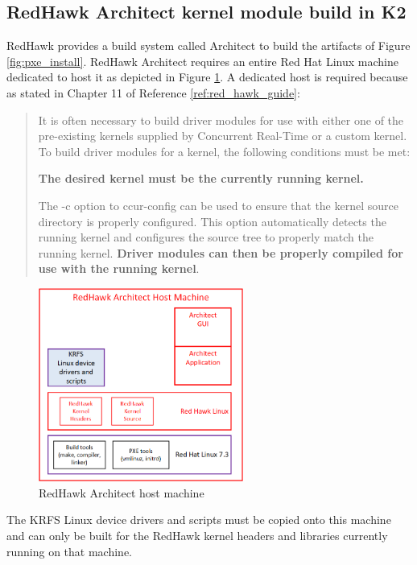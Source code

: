 \documentclass[12pt]{article}
\begin{document}
%
\subsection{RedHawk Architect kernel module build in K2}
RedHawk provides a build system called Architect to build the artifacts of Figure
\ref{fig:pxe_install}. RedHawk Architect requires an entire Red Hat Linux
machine dedicated to host it as depicted in Figure \ref{fig:architect_host}. A
dedicated host is required because as stated in Chapter 11 of Reference
\ref{ref:red_hawk_guide}:

\begin{quote}
It is often necessary to build driver modules for use with either one of the pre-existing
kernels supplied by Concurrent Real-Time or a custom kernel.
To build driver modules for a kernel, the following conditions must be met:

\textbf{The desired kernel must be the currently running kernel.}

The -c option to ccur-config can be used to ensure that the kernel source
directory is properly configured. This option automatically detects the running
kernel and configures the source tree to properly match the running kernel.
\textbf{Driver modules can then be properly compiled for use with the running
kernel}.
\end{quote}

\begin{figure}[H]
    \begin{center}
    \includegraphics[width=0.6\textwidth]{img/architect_host}
    \caption{RedHawk Architect host machine}
    \label{fig:architect_host}
    \end{center}
\end{figure}

The KRFS Linux device drivers and scripts must be copied onto this machine and
can only be built for the RedHawk kernel headers and libraries currently running
on that machine.
\end{document}
